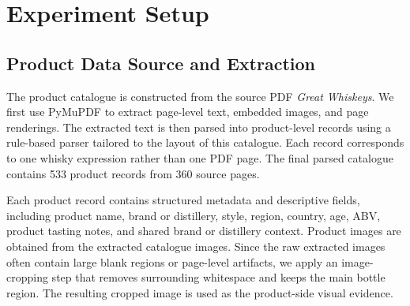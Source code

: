 \section{Experiment Setup}

\subsection{Product Data Source and Extraction}

The product catalogue is constructed from the source PDF \emph{Great Whiskeys}. We first use PyMuPDF to extract page-level text, embedded images, and page renderings. The extracted text is then parsed into product-level records using a rule-based parser tailored to the layout of this catalogue. Each record corresponds to one whisky expression rather than one PDF page. The final parsed catalogue contains 533 product records from 360 source pages.

Each product record contains structured metadata and descriptive fields, including product name, brand or distillery, style, region, country, age, ABV, product tasting notes, and shared brand or distillery context. Product images are obtained from the extracted catalogue images. Since the raw extracted images often contain large blank regions or page-level artifacts, we apply an image-cropping step that removes surrounding whitespace and keeps the main bottle region. The resulting cropped image is used as the product-side visual evidence.

